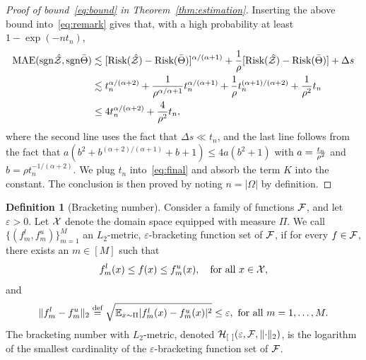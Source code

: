 \documentclass[twoside,11pt]{article}
\theoremstyle{definition}
\newtheorem{defn}{Definition}
\def\sign{\textup{sgn}}
\def\risk{\textup{Risk}}
\begin{document}
\begin{proof}[Proof of bound~\eqref{eq:bound} in Theorem~\ref{thm:estimation}]
Inserting the above bound into~\eqref{eq:remark} gives that, with a high probability at least $1-\exp(-nt_n)$,
\begin{align}\label{eq:final}
\textup{MAE}(\sign \hat \tZ, \sign \bar \Theta) &\lesssim [\risk(\hat \tZ)-\risk(\bar \Theta)]^{\alpha/(\alpha+1)}+{1\over \rho}[\risk(\hat \tZ)-\risk(\bar \Theta)]+\Delta s\notag \\
&\lesssim t_n^{\alpha/(\alpha+2)}+{1\over \rho^{\alpha/\alpha+1}}t_n^{\alpha/(\alpha+1)}+{1\over \rho}t_n^{(\alpha+1)/(\alpha+2)}+{1\over \rho^2}t_n\notag \\
&\leq 4t_n^{\alpha/(\alpha+2)}+{4\over \rho^2}t_n,
\end{align}
where the second line uses the fact that $\Delta s \ll t_n$, and the last line follows from the fact that $a(b^2+b^{(\alpha+2)/(\alpha+1)}+b+1) \leq 4 a (b^2+1)$ with $a={t_n \over \rho^2}$ and $b=\rho t_n^{-1/(\alpha+2)}$. We plug $t_n$ into~\eqref{eq:final} and absorb the term $K$ into the constant. The conclusion is then proved by noting $n=|\Omega|$ by definition. 
\end{proof}

\begin{defn}[Bracketing number]\label{pro:inftynorm}
Consider a family of functions $\mathcal{F}$, and let $\varepsilon>0$. Let $\mathcal{X} $ denote the domain space equipped with measure $\Pi$. We call $\{(f^l_m,f^u_m)\}_{m=1}^M$ an $L_2$-metric, $\varepsilon$-bracketing function set of $\mathcal{F}$, if for every $f\in \mathcal{F}$, there exists an $m\in[M]$ such that 
\[
f^l_m(x)\leq f(x)\leq f^u_m(x),\quad \text{for all }x\in\mathcal{X},
\]
and
\[
\lVert f^l_m-f^u_m\rVert_2\stackrel{\text{def}}{=}\sqrt{\mathbb{E}_{x\sim \Pi}|f^l_m(x)-f^u_m(x)|^2} \leq \varepsilon, \ \text{for all } m=1,\ldots,M. 
\]
The bracketing number with $L_2$-metric, denoted $\mathcal{H}_{[\ ]}(\varepsilon, \mathcal{F}, \lVert\cdot\rVert_2)$, is the logarithm of the smallest cardinality of the $\varepsilon$-bracketing function set of $\mathcal{F}$.  \\
\end{defn}
\end{document}
